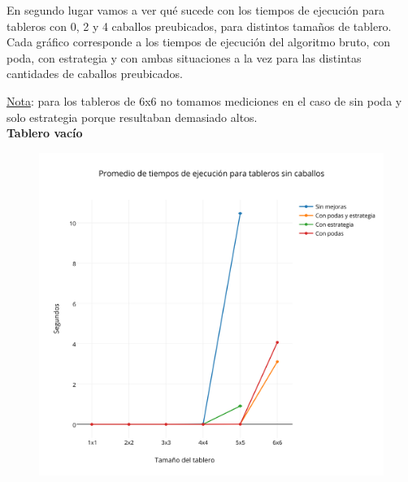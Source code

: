 En segundo lugar vamos a ver qué sucede con los tiempos de ejecuci\'on para tableros con 0, 2 y 4 caballos preubicados, para distintos tama\~nos de tablero. Cada gr\'afico corresponde a los tiempos de ejecuci\'on del algoritmo bruto, con poda, con estrategia y con ambas situaciones a la vez para las distintas cantidades de caballos preubicados.

\underline{Nota}: para los tableros de 6x6 no tomamos mediciones en el caso de sin poda y solo estrategia porque resultaban demasiado altos.\\

\textbf{{\Large Tablero vacío}}

 \begin{figure}[h!]
   \begin{center}
   \includegraphics[scale=0.3]{../src/ej3/Mediciones/vacios/promedios1.png}
   \end{center}
 \end{figure}

